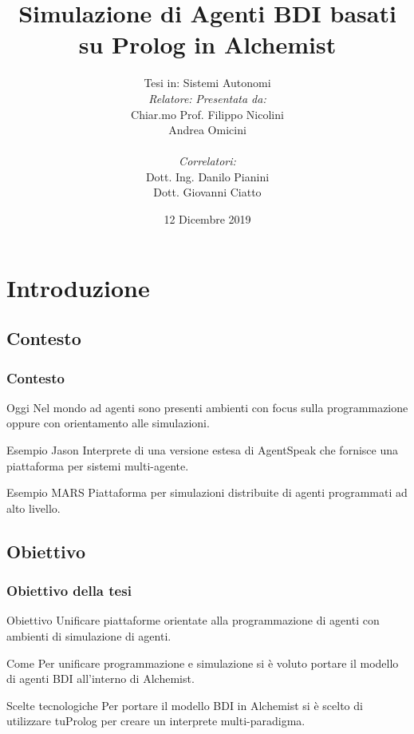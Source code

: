 \documentclass[handout]{beamer}\mode<presentation>{\usetheme{AMSCesenaBleu}}
\title[Agenti BDI basati su Prolog in Alchemist]{Simulazione di Agenti BDI basati su Prolog in Alchemist}
\author[Filippo Nicolini]{Tesi in: Sistemi Autonomi\\
[0.5cm]
\textit{Relatore:} \hspace{6.55cm} \textit{Presentata da:}\\
Chiar.mo Prof. \hspace{5.5cm} Filippo Nicolini\\
Andrea Omicini \hspace{7.6cm} \phantom{g}\\
\textit{\\Correlatori:} \hspace{8.25cm} \phantom{g}\\
Dott. Ing. Danilo Pianini \hspace{6cm} \phantom{g}\\
Dott. Giovanni Ciatto \hspace{6.5cm} \phantom{g}\\
}
\institute[]{
\textsc{Alma Mater Studiorum} -- Università di Bologna \\
Campus di Cesena}
\date{12 Dicembre 2019}
\begin{document}
\maketitle


\section{Introduzione}

\subsection{Contesto}
\begin{frame}
\frametitle{Contesto}
\begin{block}{Oggi}
Nel mondo ad agenti sono presenti ambienti con focus sulla programmazione oppure con orientamento alle simulazioni.
\end{block}

\begin{block}{Esempio Jason}
Interprete di una versione estesa di AgentSpeak che fornisce una piattaforma per sistemi multi-agente.
\end{block}

\begin{block}{Esempio MARS}
Piattaforma per simulazioni distribuite di agenti programmati ad alto livello.
\end{block}
\end{frame}

\subsection{Obiettivo}
\begin{frame}
\frametitle{Obiettivo della tesi}
\begin{block}{Obiettivo}
\alert{Unificare} piattaforme orientate alla \alert{programmazione di agenti} con ambienti di \alert{simulazione di agenti}.
\end{block}

\begin{block}{Come}
Per unificare programmazione e simulazione si è voluto portare il modello di agenti BDI all'interno di Alchemist.
\end{block}

\begin{block}{Scelte tecnologiche}
Per portare il modello BDI in Alchemist si è scelto di utilizzare tuProlog per creare un interprete multi-paradigma.
\end{block}
\end{frame}
\end{document}
